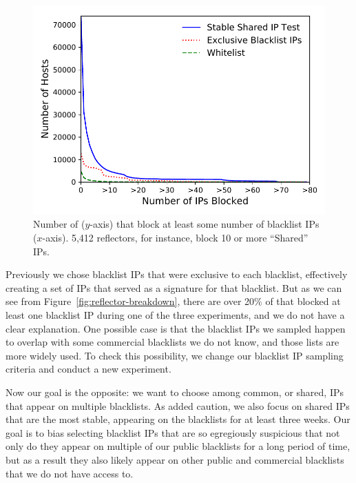 \begin{figure}[t]
\centering
\includegraphics[width=1.0\columnwidth]{images/large_scale_rcdf_v2.pdf}
\caption{Number of {} ($y$-axis) that block at least
  some number of blacklist IPs ($x$-axis).  5,412 reflectors,
  for instance, block 10 or more ``Shared'' IPs.}
\label{fig:large_scale_rcdf}
\end{figure}


Previously we chose blacklist IPs that were exclusive to each
blacklist, effectively creating a set of IPs that served as a
signature for that blacklist. But as we can see from Figure~\ref{fig:reflector-breakdown},
there are over 20\% of {} that blocked at least one
blacklist IP during one of the three experiments, and we do not
have a clear explanation. One possible case is that the blacklist IPs
we sampled happen to overlap with some commercial blacklists we
do not know, and those lists are more widely used. To check this
possibility, we change our blacklist IP sampling criteria and conduct
a new experiment.

Now our goal is the opposite: we want
to choose among common, or shared, IPs that appear on multiple
blacklists.  As added caution, we also focus on shared IPs that are
the most stable, appearing on the blacklists for at least three weeks.
Our goal is to bias selecting blacklist IPs that are so egregiously
suspicious that not only do they appear on multiple of our public
blacklists for a long period of time, but as a result they also likely
appear on other public and commercial blacklists that we do not have
access to.


